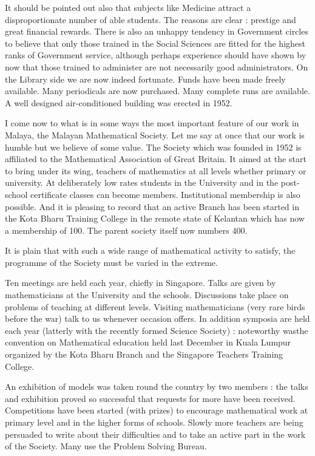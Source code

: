 It should be pointed out also that subjects like Medicine attract a disproportionate number of able students. The reasons are clear : prestige and great financial rewards. There is also an unhappy tendency in Government circles to believe that only those trained in the Social Sciences are fitted for the highest ranks of Government service, although perhaps experience should have shown by now that those trained to administer are not necessarily good administrators. On the Library side we are now indeed fortunate. Funds have been made freely available. Many periodicals are now purchased. Many complete runs are available. A well designed air-conditioned building was erected in 1952.

I come now to what is in some ways the most important feature of our work in Malaya, the Malayan Mathematical Society. Let me say at once that our work is humble but we believe of some value. The Society which was founded in 1952 is affiliated to the Mathematical Association of Great Britain. It aimed at the start to bring under its wing, teachers of mathematics at all levels whether primary or university. At deliberately low rates students in the University and in the post-school certificate classes can become members. Institutional membership is also possible. And it is pleasing to record that an active Branch has been started in the Kota Bharu Training College in the remote state of Kelantan which has now a membership of 100. The parent society itself now numbers 400.

\newpage

It is plain that with such a wide range of mathematical activity to satisfy, the programme of the Society must be varied in the extreme.

\smallskip
Ten meetings are held each year, chiefly in Singapore. Talks are given by mathematicians at the University and the schools. Discussions take place on problems of teaching at different levels. Visiting mathematicians (very rare birds before the war) talk to us whenever occasion offers. In addition symposia are held each year (latterly with the recently formed Science Society) : noteworthy was\pageoriginale the convention on Mathematical education held last December in Kuala Lumpur organized by the Kota Bharu Branch and the Singapore Teachers Training College.

\smallskip
An exhibition of models was taken round the country by two members : the talks and exhibition proved so successful that requests for more have been received. Competitions have been started (with prizes) to encourage mathematical work at primary level and in the higher forms of schools. Slowly more teachers are being persuaded to write about their difficulties and to take an active part in the work of the Society. Many use the Problem Solving Bureau.

